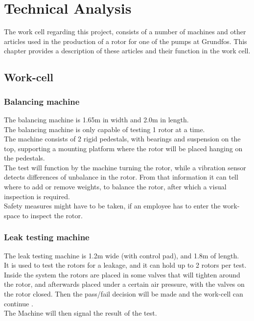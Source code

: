  \chapter{Technical Analysis} \label{TechAnalysis}
 
 The work cell regarding this project, consists of a number of machines and other articles used in the production of a rotor for one of the pumps at Grundfos. This chapter provides a description of these articles and their function in the work cell.\\
 
 \section{Work-cell}
 
 \subsection{Balancing machine}
 
 The balancing machine is 1.65m in width and 2.0m in length.\\
 The balancing machine is only capable of testing 1 rotor at a time.\\
 The machine consists of 2 rigid pedestals, with bearings and suspension on the top, supporting a mounting platform where the rotor will be placed hanging on the pedestals.\\

The test will function by the machine turning the rotor, while a vibration sensor detects differences of unbalance in the rotor. From that information it can tell where to add or remove weights, to balance the rotor, after which a visual inspection is required.\\

Safety measures might have to be taken, if an employee has to enter the work-space to inspect the rotor.
 
 \subsection{Leak testing machine}
 
 The leak testing machine is 1.2m wide (with control pad), and 1.8m of length.\\ 
 It is used to test the rotors for a leakage, and it can hold up to 2 rotors per test.\\
 Inside the system the rotors are placed in some valves that will tighten around the rotor, and afterwards placed under a certain air pressure, with the valves on the rotor closed. Then the pass/fail decision will be made and the work-cell can continue \cite{LEAK}.\\
 The Machine will then signal the result of the test.\\
 
